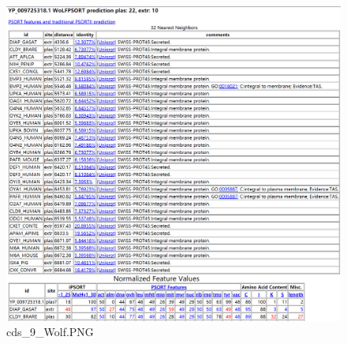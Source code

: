 \documentclass[supercite]{HustGraduPaper}
\begin{document}
	\begin{figure}[H]
		\centering
		\includegraphics[width=1\textwidth]{./material/practice2/cds_9/wolf.png}
		\caption{cds\_9\_Wolf.PNG}
	\end{figure}
\end{document}
